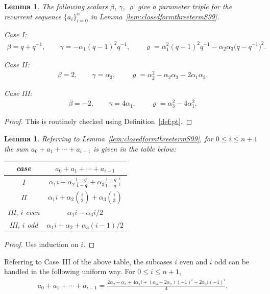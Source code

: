 \documentclass[pdftex]{sigma}
\numberwithin{equation}{section}
\newtheorem{Lemma}[Theorem]{Lemma}
\begin{document}
\begin{Lemma}\label{lem:bgv}
The following scalars $\beta$, $\gamma$, $\varrho$ give a parameter triple
for the recurrent sequence $\lbrace a_i \rbrace_{i=0}^n$ in
Lemma~{\rm \ref{lem:closedformthreetermS99}}.

Case I:
\begin{gather*}
\beta = q + q^{-1},
\qquad
\gamma = - \alpha_1 (q-1)^2 q^{-1},
\qquad
\varrho = \alpha_1^2(q-1)^2 q^{-1} - \alpha_2 \alpha_3 \big(q-q^{-1}\big)^2.
\end{gather*}

Case II:
\begin{gather*}
\beta = 2, \qquad \gamma = \alpha_3, \qquad
\varrho = \alpha_2^2 - \alpha_2 \alpha_3 - 2 \alpha_1 \alpha_3.
\end{gather*}

Case III:
\begin{gather*}
\beta = -2,
\qquad
\gamma = 4 \alpha_1,
\qquad
\varrho = \alpha_3^2 - 4 \alpha_1^2.
\end{gather*}
\end{Lemma}
\begin{proof} This is routinely checked using Definition~\ref{def:pt}.
\end{proof}

\begin{Lemma}\label{lem:asum}
Referring to Lemma~{\rm \ref{lem:closedformthreetermS99}}, for $0 \leq i \leq n+1$
the sum $a_0+a_1+ \cdots + a_{i-1}$ is given in the table below:
\begin{center}
\begin{tabular}[t]{c|c}
case & $a_0+a_1+ \cdots + a_{i-1}$
\\
\hline
I & $\alpha_1 i + \alpha_2 \frac{1-q^i}{1-q} + \alpha_3
\frac{1-q^{-i}}{1-q^{-1}} $
 \\
II &
$\alpha_1 i + \alpha_2 \binom{i}{2} + \alpha_3 \binom{i}{3} $
\\
III, $i$ even &
 $\alpha_1 i - \alpha_3 i/2$
\\
III, $i$ odd &
$\alpha_1 i + \alpha_2 + \alpha_3(i-1)/2$
\end{tabular}
\end{center}
\end{Lemma}
\begin{proof} Use induction on $i$.
\end{proof}

\begin{Note}Referring to Case~III of the above table,
the subcases $i$ even and $i$ odd can be handled
in the following uniform way. For $0 \leq i \leq n+1$,
\begin{gather*}
a_0 + a_1+\cdots + a_{i-1} = \frac{2\alpha_2-\alpha_3 +4\alpha_1 i
+ (\alpha_3-2\alpha_2)(-1)^i -2\alpha_3 i (-1)^i}{4}.
\end{gather*}
\end{Note}
\end{document}
